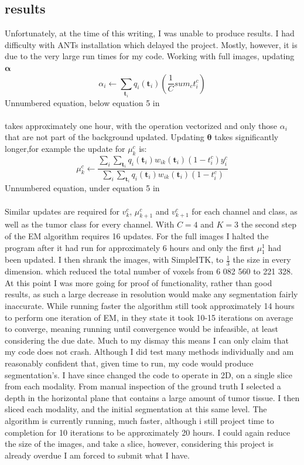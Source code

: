 \documentclass[10pt,twocolumn,letterpaper]{article}
\begin{document}
\subsection{results}
Unfortunately, at the time of this writing, I was unable to produce results. I had difficulty with ANTs installation which delayed the project. Mostly, however, it is due to the very large run times for my code. Working with full images, updating $\boldsymbol{\alpha}$ 
\begin{equation}
\alpha_i \leftarrow \sum_{\boldsymbol{t}_i}q_i(\boldsymbol{t}_i)\left( \frac{1}{C}sum_ct_i^c\right)
\end{equation}
Unnumbered equation, below equation 5 in \cite{Menze2010}
\\\\
takes approximately one hour, with the operation vectorized and only those $\alpha_i$ that are not part of the background updated. Updating $\boldsymbol{\theta}$ takes significantly longer,for example the update for $\mu_k^c$ is:
\begin{equation}
\mu_k^c \leftarrow \frac{\sum_i\sum_{\boldsymbol{t}_i}q_i(\boldsymbol{t}_i)w_{ik}(\boldsymbol{t}_i)(1-t_i^c)y_i^c}{\sum_i\sum_{\boldsymbol{t}_i}q_i(\boldsymbol{t}_i)w_{ik}(\boldsymbol{t}_i)(1-t_i^c)}
\end{equation}
Unnumbered equation, under equation 5 in \cite{Menze2010}
\\\\
Similar updates are required for $v_k^c$, $\mu_{k+1}^c$ and $v_{k+1}^c$ for each channel and class, as well as the tumor class for every channel. With $C=4$ and $K=3$ the second step of the EM algorithm requires 16 updates. For the full images I halted the program after it had run for approximately 6 hours and only the first $\mu_1^1$ had been updated. I then shrank the images, with SimpleITK, to $\tfrac{1}{3}$ the size in every dimension. which reduced the total number of voxels from 6 082 560 to 221 328. At this point I was more going for proof of functionality, rather than good results, as such a large decrease in resolution would make any segmentation fairly inaccurate. While running faster the algorithm still took approximately 14 hours to perform one iteration of EM, in \cite{Menze2010} they state it took 10-15 iterations on average to converge, meaning running until convergence would be infeasible, at least considering the due date. Much to my dismay this means I can only claim that my code does not crash. Although I did test many methods individually and am reasonably confident that, given time to run, my code would produce segmentation's. I have since changed the code to operate in 2D, on a single slice from each modality. From manual  inspection of the ground truth I selected a depth in the horizontal plane that contains a large amount of tumor tissue. I then sliced each modality, and the initial segmentation at this same level. The algorithm is currently running, much faster, although i still project time to completion for 10 iterations to be approximately 20 hours. I could again reduce the size of the images, and take a slice, however, considering this project is already overdue I am forced to submit what I have.
\end{document}
